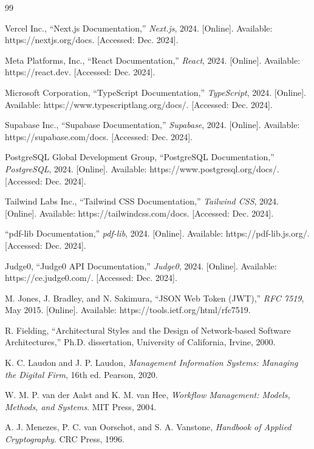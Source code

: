 \begin{thebibliography}{99}

Vercel Inc., ``Next.js Documentation,'' \textit{Next.js}, 2024. [Online]. Available: https://nextjs.org/docs. [Accessed: Dec. 2024].

Meta Platforms, Inc., ``React Documentation,'' \textit{React}, 2024. [Online]. Available: https://react.dev. [Accessed: Dec. 2024].

Microsoft Corporation, ``TypeScript Documentation,'' \textit{TypeScript}, 2024. [Online]. Available: https://www.typescriptlang.org/docs/. [Accessed: Dec. 2024].

Supabase Inc., ``Supabase Documentation,'' \textit{Supabase}, 2024. [Online]. Available: https://supabase.com/docs. [Accessed: Dec. 2024].

PostgreSQL Global Development Group, ``PostgreSQL Documentation,'' \textit{PostgreSQL}, 2024. [Online]. Available: https://www.postgresql.org/docs/. [Accessed: Dec. 2024].

Tailwind Labs Inc., ``Tailwind CSS Documentation,'' \textit{Tailwind CSS}, 2024. [Online]. Available: https://tailwindcss.com/docs. [Accessed: Dec. 2024].

``pdf-lib Documentation,'' \textit{pdf-lib}, 2024. [Online]. Available: https://pdf-lib.js.org/. [Accessed: Dec. 2024].

Judge0, ``Judge0 API Documentation,'' \textit{Judge0}, 2024. [Online]. Available: https://ce.judge0.com/. [Accessed: Dec. 2024].

M. Jones, J. Bradley, and N. Sakimura, ``JSON Web Token (JWT),'' \textit{RFC 7519}, May 2015. [Online]. Available: https://tools.ietf.org/html/rfc7519.

R. Fielding, ``Architectural Styles and the Design of Network-based Software Architectures,'' Ph.D. dissertation, University of California, Irvine, 2000.

K. C. Laudon and J. P. Laudon, \textit{Management Information Systems: Managing the Digital Firm}, 16th ed. Pearson, 2020.

W. M. P. van der Aalst and K. M. van Hee, \textit{Workflow Management: Models, Methods, and Systems}. MIT Press, 2004.

A. J. Menezes, P. C. van Oorschot, and S. A. Vanstone, \textit{Handbook of Applied Cryptography}. CRC Press, 1996.


\end{thebibliography}
